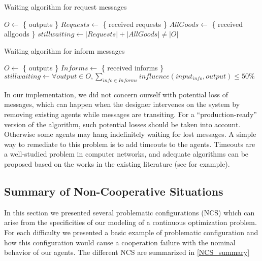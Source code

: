 \begin{algorithm}
\caption{Waiting algorithm for request messages}
\label{algo_waiting_requests}

	$O \leftarrow $ \{ outputs \}\;
	$Requests \leftarrow $ \{ received requests \}\;
	$AllGoods \leftarrow $ \{ received allgoods \}\;
	$stillwaiting \leftarrow |Requests| + |AllGoods| \neq |O|$\;

\end{algorithm}

\begin{algorithm}
\caption{Waiting algorithm for inform messages}
\label{algo_waiting_inform}

	$O \leftarrow $ \{ outputs \}\;
	$Informs \leftarrow $ \{ received informs \}\;
	$stillwaiting \leftarrow \forall output \in O, \displaystyle\sum_{info \in Informs}{ influence(input_{info}, output) \leq 50\%}$\;

\end{algorithm}

In our implementation, we did not concern ourself with potential loss of messages, which can happen when the designer intervenes on the system by removing existing agents while messages are transiting. For a \enquote{production-ready} version of the algorithm, such potential losses should be taken into account. Otherwise some agents may hang indefinitely waiting for lost messages. A simple way to remediate to this problem is to add timeouts to the agents. Timeouts are a well-studied problem in computer networks, and adequate algorithms can be proposed based on the works in the existing literature (see \cite{jacobson1988congestion} for example).

\subsection{Summary of Non-Cooperative Situations}

In this section we presented several problematic configurations (NCS) which can arise from the specificities of our modeling of a continuous optimization problem. For each difficulty we presented a basic example of problematic configuration and how this configuration would cause a cooperation failure with the nominal behavior of our agents. The different NCS are summarized in \tablename{} \ref{NCS_summary}

